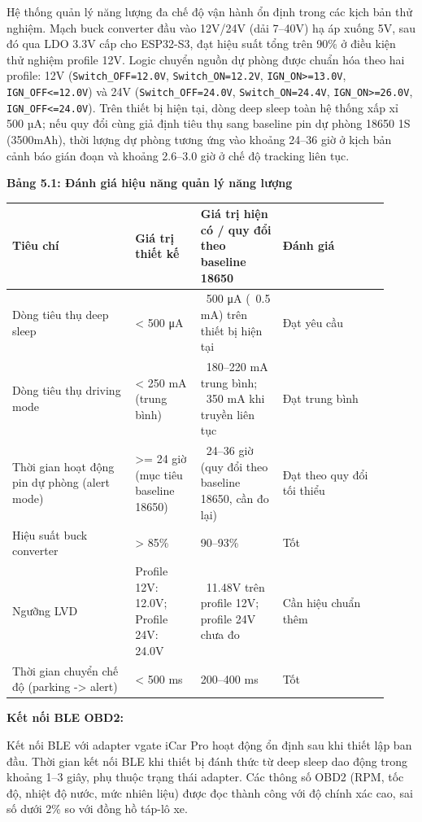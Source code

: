 \documentclass[13pt,a4paper]{extarticle}
\newcounter{none} %
\newcommand{\thesislongtableorignewline}{}
\let\thesislongtableorignewline\\
\renewcommand{\\}{\thesislongtableorignewline\hline}%
\let\\\thesislongtableorignewline
\newcommand{\thesistabletitle}[1]{%
  \begin{center}\textbf{#1}\end{center}%
}
\begin{document}
Hệ thống quản lý năng lượng đa chế độ vận hành ổn định trong các kịch
bản thử nghiệm. Mạch buck converter đầu vào 12V/24V (dải 7--40V) hạ áp
xuống 5V, sau đó qua LDO 3.3V cấp cho ESP32-S3, đạt hiệu suất tổng trên
90\% ở điều kiện thử nghiệm profile 12V. Logic chuyển nguồn dự phòng
được chuẩn hóa theo hai profile: 12V (\texttt{Switch\_OFF=12.0V},
\texttt{Switch\_ON=12.2V}, \texttt{IGN\_ON\textgreater{}=13.0V},
\texttt{IGN\_OFF\textless{}=12.0V}) và 24V (\texttt{Switch\_OFF=24.0V},
\texttt{Switch\_ON=24.4V}, \texttt{IGN\_ON\textgreater{}=26.0V},
\texttt{IGN\_OFF\textless{}=24.0V}). Trên thiết bị hiện tại, dòng deep
sleep toàn hệ thống xấp xỉ 500 µA; nếu quy đổi cùng giả định tiêu thụ
sang baseline pin dự phòng 18650 1S (3500mAh), thời lượng dự phòng tương
ứng vào khoảng 24--36 giờ ở kịch bản cảnh báo gián đoạn và khoảng
2.6--3.0 giờ ở chế độ tracking liên tục.

\thesistabletitle{Bảng 5.1: Đánh giá hiệu năng quản lý năng lượng}

{\def\LTcaptype{none} %
\begin{longtable}{|p{0.30\linewidth}|p{0.16\linewidth}|p{0.20\linewidth}|p{0.26\linewidth}|}
\hline \textbf{Tiêu chí} & \textbf{Giá trị thiết kế} & \textbf{Giá trị hiện có / quy đổi theo baseline
18650} & \textbf{Đánh giá} \\
\hline
\endhead
\hline
\endlastfoot
Dòng tiêu thụ deep sleep & \textless{} 500 μA & ~500 μA
(~0.5 mA) trên thiết bị hiện tại & Đạt yêu cầu \\
Dòng tiêu thụ driving mode & \textless{} 250 mA (trung bình) &
~180--220 mA trung bình; ~350 mA khi truyền
liên tục & Đạt trung bình \\
Thời gian hoạt động pin dự phòng (alert mode) & \textgreater= 24 giờ
(mục tiêu baseline 18650) & ~24--36 giờ (quy đổi theo
baseline 18650, cần đo lại) & Đạt theo quy đổi tối thiểu \\
Hiệu suất buck converter & \textgreater{} 85\% & 90--93\% & Tốt \\
Ngưỡng LVD & Profile 12V: 12.0V; Profile 24V: 24.0V &
~11.48V trên profile 12V; profile 24V chưa đo & Cần hiệu
chuẩn thêm \\
Thời gian chuyển chế độ (parking -\textgreater{} alert) & \textless{}
500 ms & 200--400 ms & Tốt \\
\end{longtable}
}

\textbf{Kết nối BLE OBD2:}

Kết nối BLE với adapter vgate iCar Pro hoạt động ổn định sau khi thiết
lập ban đầu. Thời gian kết nối BLE khi thiết bị đánh thức từ deep sleep
dao động trong khoảng 1--3 giây, phụ thuộc trạng thái adapter. Các thông
số OBD2 (RPM, tốc độ, nhiệt độ nước, mức nhiên liệu) được đọc thành công
với độ chính xác cao, sai số dưới 2\% so với đồng hồ táp-lô xe.
\end{document}
